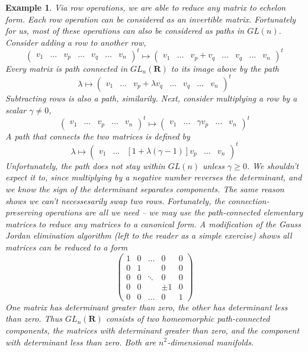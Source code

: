 \documentclass[12pt]{report}
\theoremstyle{plain}
\newtheorem*{example}{Example}
\theoremstyle{definition}
\begin{document}
\begin{example}
    Via row operations, we are able to reduce any matrix to echelon form. Each row operation can be considered as an invertible matrix. Fortunately for us, most of these operations can also be considered as paths in $GL(n)$. Consider adding a row to another row,
    \[ \begin{pmatrix} v_1 & \dots & v_p & \dots & v_q & \dots & v_n \end{pmatrix}^t \mapsto \begin{pmatrix} v_1 & \dots & v_p + v_q & \dots & v_q & \dots & v_n \end{pmatrix}^t \]
    Every matrix is path connected in $GL_n(\mathbf{R})$ to its image above by the path
    \[ \lambda \mapsto \begin{pmatrix} v_1 & \dots & v_p + \lambda v_q & \dots & v_q & \dots & v_n \end{pmatrix}^t \]
    Subtracting rows is also a path, similarily. Next, consider multiplying a row by a scalar $\gamma \neq 0$,
    \[ \begin{pmatrix} v_1 & \dots & v_p & \dots & v_n \end{pmatrix}^t \mapsto \begin{pmatrix} v_1 & \dots & \gamma v_p & \dots & v_n \end{pmatrix}^t \]
    A path that connects the two matrices is defined by
    \[ \lambda \mapsto \begin{pmatrix} v_1 & \dots & [1 + \lambda(\gamma - 1)]v_p & \dots & v_n \end{pmatrix}^t \]
    Unfortunately, the path does not stay within $GL(n)$ unless $\gamma \geq 0$. We shouldn't expect it to, since multiplying by a negative number reverses the determinant, and we know the sign of the determinant separates components. The same reason shows we can't necessesarily swap two rows. Fortunately, the connection-preserving operations are all we need -- we may use the path-connected elementary matrices to reduce any matrices to a canonical form. A modification of the Gauss Jordan elimination algorithm (left to the reader as a simple exercise) shows all matrices can be reduced to a form
    \[ \begin{pmatrix} 1 & 0 & \dots & 0 & 0 \\ 0 & 1 & & 0 & 0 \\ 0 & 0 & \ddots & 0 & 0 \\ 0 & 0 &  & \pm 1 & 0 \\ 0 & 0 & \dots & 0 & 1 \end{pmatrix} \]
    One matrix has determinant greater than zero, the other has determinant less than zero. Thus $GL_n(\mathbf{R})$ consists of two homeomorphic path-connected components, the matrices with determinant greater than zero, and the component with determinant less than zero. Both are $n^2$-dimensional manifolds.
\end{example}
\end{document}
